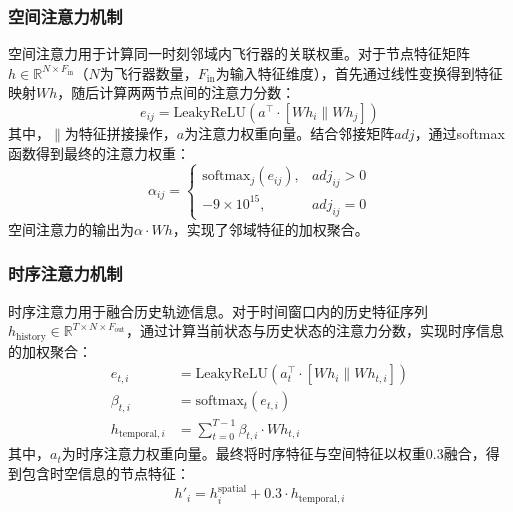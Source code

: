 \documentclass[12pt,a4paper,UTF8]{ctexart}
\begin{document}
\subsubsection{空间注意力机制}
空间注意力用于计算同一时刻邻域内飞行器的关联权重。对于节点特征矩阵$h \in \mathbb{R}^{N \times F_{\text{in}}}$（$N$为飞行器数量，$F_{\text{in}}$为输入特征维度），首先通过线性变换得到特征映射$Wh$，随后计算两两节点间的注意力分数：
\begin{equation}
    e_{ij} = \text{LeakyReLU}\left(a^{\top} \cdot [Wh_i \parallel Wh_j]\right)
\end{equation}
其中，$\parallel$为特征拼接操作，$a$为注意力权重向量。结合邻接矩阵$adj$，通过softmax函数得到最终的注意力权重：
\begin{equation}
    \alpha_{ij} =
    \begin{cases}
        \text{softmax}_j(e_{ij}), & adj_{ij} > 0 \\
        -9 \times 10^{15}, & adj_{ij} = 0
    \end{cases}
\end{equation}
空间注意力的输出为$\alpha \cdot Wh$，实现了邻域特征的加权聚合。

\subsubsection{时序注意力机制}
时序注意力用于融合历史轨迹信息。对于时间窗口内的历史特征序列$h_{\text{history}} \in \mathbb{R}^{T \times N \times F_{\text{out}}}$，通过计算当前状态与历史状态的注意力分数，实现时序信息的加权聚合：
\begin{align}
    e_{t,i} &= \text{LeakyReLU}\left(a_t^{\top} \cdot [Wh_i \parallel Wh_{t,i}]\right) \\
    \beta_{t,i} &= \text{softmax}_t(e_{t,i}) \\
    h_{\text{temporal},i} &= \sum_{t=0}^{T-1} \beta_{t,i} \cdot Wh_{t,i}
\end{align}
其中，$a_t$为时序注意力权重向量。最终将时序特征与空间特征以权重$0.3$融合，得到包含时空信息的节点特征：
\begin{equation}
    h'_i = h_i^{\text{spatial}} + 0.3 \cdot h_{\text{temporal},i}
\end{equation}
\end{document}
